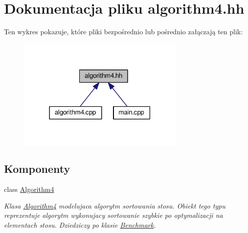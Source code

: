 \hypertarget{algorithm4_8hh}{\section{Dokumentacja pliku algorithm4.\-hh}
\label{algorithm4_8hh}
}
Ten wykres pokazuje, które pliki bezpośrednio lub pośrednio załączają ten plik\-:\nopagebreak
\begin{figure}[H]
\begin{center}
\leavevmode
\includegraphics[width=234pt]{algorithm4_8hh__dep__incl}
\end{center}
\end{figure}
\subsection*{Komponenty}
\begin{DoxyCompactItemize}
\item 
class \hyperlink{class_algorithm4}{Algorithm4}
\begin{DoxyCompactList}\small\item\em Klasa \hyperlink{class_algorithm4}{Algorithm4} modelujaca algorytm sortowania stosu. Obiekt tego typu reprezentuje algorytm wykonujacy sortowanie szybkie po optymalizacji na elementach stosu. Dziedziczy po klasie \hyperlink{class_benchmark}{Benchmark}. \end{DoxyCompactList}\end{DoxyCompactItemize}

